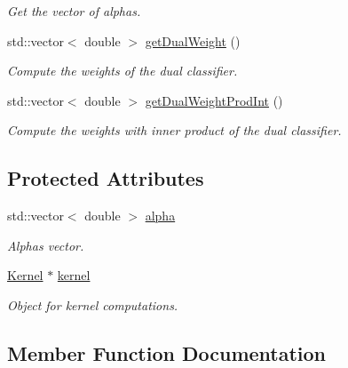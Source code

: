 \begin{DoxyCompactItemize}
\begin{DoxyCompactList}\small\item\em Get the vector of alphas. \end{DoxyCompactList}\item 
std\+::vector$<$ double $>$ \hyperlink{class_dual_classifier_a179729f872fe280d752089c571187fbf}{get\+Dual\+Weight} ()
\begin{DoxyCompactList}\small\item\em Compute the weights of the dual classifier. \end{DoxyCompactList}\item 
std\+::vector$<$ double $>$ \hyperlink{class_dual_classifier_a2780174d195acdfc2d3c9777c48e818c}{get\+Dual\+Weight\+Prod\+Int} ()
\begin{DoxyCompactList}\small\item\em Compute the weights with inner product of the dual classifier. \end{DoxyCompactList}\end{DoxyCompactItemize}
\subsection*{Protected Attributes}
\begin{DoxyCompactItemize}
\item 
std\+::vector$<$ double $>$ \hyperlink{class_dual_classifier_a204d0e925be1450c97dd8635b8c9f3e9}{alpha}\hypertarget{class_dual_classifier_a204d0e925be1450c97dd8635b8c9f3e9}{}\label{class_dual_classifier_a204d0e925be1450c97dd8635b8c9f3e9}

\begin{DoxyCompactList}\small\item\em Alphas vector. \end{DoxyCompactList}\item 
\hyperlink{class_kernel}{Kernel} $\ast$ \hyperlink{class_dual_classifier_a40c32ed2991c8545d50ef5fe57611c28}{kernel}\hypertarget{class_dual_classifier_a40c32ed2991c8545d50ef5fe57611c28}{}\label{class_dual_classifier_a40c32ed2991c8545d50ef5fe57611c28}

\begin{DoxyCompactList}\small\item\em Object for kernel computations. \end{DoxyCompactList}\end{DoxyCompactItemize}


\subsection{Member Function Documentation}
